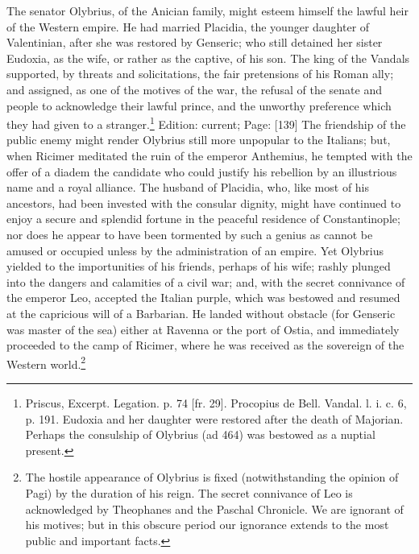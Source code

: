 The senator Olybrius, of the Anician family, might esteem himself the lawful heir of the Western empire. He had married Placidia, the younger daughter of Valentinian, after she was restored by Genseric; who still detained her sister Eudoxia, as the wife, or rather as the captive, of his son. The king of the Vandals supported, by threats and solicitations, the fair pretensions of his Roman ally; and assigned, as one of the motives of the war, the refusal of the senate and people to acknowledge their lawful prince, and the unworthy preference which they had given to a stranger.\footnote{Priscus, Excerpt. Legation. p. 74 [fr. 29]. Procopius de Bell. Vandal. l. i. c. 6, p. 191. Eudoxia and her daughter were restored after the death of Majorian. Perhaps the consulship of Olybrius (ad 464) was bestowed as a nuptial present.} Edition: current; Page: [139] The friendship of the public enemy might render Olybrius still more unpopular to the Italians; but, when Ricimer meditated the ruin of the emperor Anthemius, he tempted with the offer of a diadem the candidate who could justify his rebellion by an illustrious name and a royal alliance. The husband of Placidia, who, like most of his ancestors, had been invested with the consular dignity, might have continued to enjoy a secure and splendid fortune in the peaceful residence of Constantinople; nor does he appear to have been tormented by such a genius as cannot be amused or occupied unless by the administration of an empire. Yet Olybrius yielded to the importunities of his friends, perhaps of his wife; rashly plunged into the dangers and calamities of a civil war; and, with the secret connivance of the emperor Leo, accepted the Italian purple, which was bestowed and resumed at the capricious will of a Barbarian. He landed without obstacle (for Genseric was master of the sea) either at Ravenna or the port of Ostia, and immediately proceeded to the camp of Ricimer, where he was received as the sovereign of the Western world.\footnote{The hostile appearance of Olybrius is fixed (notwithstanding the opinion of Pagi) by the duration of his reign. The secret connivance of Leo is acknowledged by Theophanes and the Paschal Chronicle. We are ignorant of his motives; but in this obscure period our ignorance extends to the most public and important facts.}

